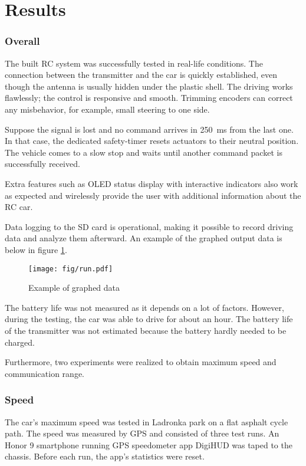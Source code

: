 


\part{Results}
\label{chap:results}
\section{Overall}
The built RC system was successfully tested in real-life conditions. The connection between the transmitter and the car is quickly established, even though the antenna is usually hidden under the plastic shell. The driving works flawlessly; the control is responsive and smooth. Trimming encoders can correct any misbehavior, for example, small steering to one side.

Suppose the signal is lost and no command arrives in \SI{250}{\ms} from the last one. In that case, the dedicated safety-timer resets actuators to their neutral position. The vehicle comes to a slow stop and waits until another command packet is successfully received.

Extra features such as OLED status display with interactive indicators also work as expected and wirelessly provide the user with additional information about the RC car.

Data logging to the SD card is operational, making it possible to record driving data and analyze them afterward. An example of the graphed output data is below in figure \ref{fig:data_graph}.
\begin{figure}[h]
\centering
\texttt{[image: fig/run.pdf]}
\caption{Example of graphed data}
\label{fig:data_graph}
\end{figure}

The battery life was not measured as it depends on a lot of factors. However, during the testing, the car was able to drive for about an hour. The battery life of the transmitter was not estimated because the battery hardly needed to be charged.

Furthermore, two experiments were realized to obtain maximum speed and communication range.

\section{Speed}
The car's maximum speed was tested in Ladronka park on a flat asphalt cycle path. The speed was measured by GPS and consisted of three test runs. An Honor 9 smartphone running GPS speedometer app DigiHUD was taped to the chassis. Before each run, the app's statistics were reset.

